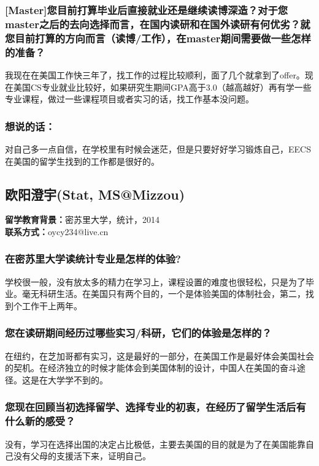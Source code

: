 \documentclass[a4paper,UTF8]{book}
\begin{document}
    \subsubsection*{[Master]您目前打算毕业后直接就业还是继续读博深造？对于您master之后的去向选择而言，在国内读研和在国外读研有何优劣？就您目前打算的方向而言（读博/工作），在master期间需要做一些怎样的准备？}
    我现在在美国工作快三年了，找工作的过程比较顺利，面了几个就拿到了offer。现在美国CS专业就业比较好，如果研究生期间GPA高于3.0（越高越好）再有学一些专业课程，做过一些课程项目或者实习的话，找工作基本没问题。                
    
    \subsubsection{想说的话：}
    对自己多一点自信，在学校里有时候会迷茫，但是只要好好学习锻炼自己，EECS在美国的留学生找到的工作都是很好的。

\clearpage
\subsection{欧阳澄宇(Stat, MS@Mizzou)}
    \textbf{留学教育背景：}密苏里大学，统计，2014\\
    \textbf{联系方式：}oycy234@live.cn

    \subsubsection*{在密苏里大学读统计专业是怎样的体验?}
    学校很一般，没有放太多的精力在学习上，课程设置的难度也很轻松，只是为了毕业。毫无科研生活。在美国只有两个目的，一个是体验美国的体制社会，第二，找到个工作干上两年。

    \subsubsection*{您在读研期间经历过哪些实习/科研，它们的体验是怎样的？}
    在纽约，在芝加哥都有实习，这是最好的一部分，在美国工作是最好体会美国社会的契机。在经济独立的时候才能体会到美国体制的设计，中国人在美国的奋斗途径。这是在大学学不到的。

    \subsubsection*{您现在回顾当初选择留学、选择专业的初衷，在经历了留学生活后有什么新的感受？}
    没有，学习在选择出国的决定占比极低，主要去美国的目的就是为了在美国能靠自己没有父母的支援活下来，证明自己。
\end{document}
